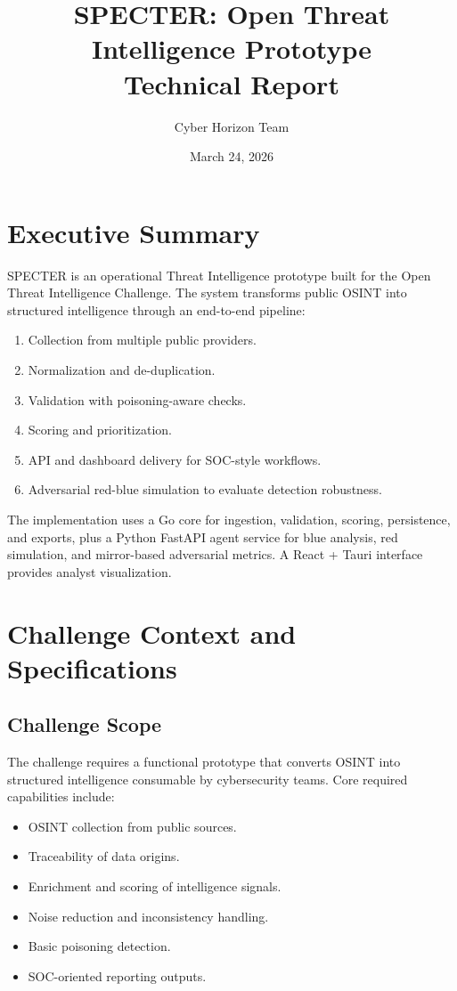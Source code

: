 \documentclass[11pt,a4paper]{article}
\title{SPECTER: Open Threat Intelligence Prototype\\Technical Report}
\author{Cyber Horizon Team}
\date{March 24, 2026}
\begin{document}
\maketitle
\tableofcontents
\newpage

\section{Executive Summary}
SPECTER is an operational Threat Intelligence prototype built for the Open Threat Intelligence Challenge. The system transforms public OSINT into structured intelligence through an end-to-end pipeline:
\begin{enumerate}[leftmargin=1.5em]
  \item Collection from multiple public providers.
  \item Normalization and de-duplication.
  \item Validation with poisoning-aware checks.
  \item Scoring and prioritization.
  \item API and dashboard delivery for SOC-style workflows.
  \item Adversarial red-blue simulation to evaluate detection robustness.
\end{enumerate}

The implementation uses a Go core for ingestion, validation, scoring, persistence, and exports, plus a Python FastAPI agent service for blue analysis, red simulation, and mirror-based adversarial metrics. A React + Tauri interface provides analyst visualization.

\section{Challenge Context and Specifications}
\subsection{Challenge Scope}
The challenge requires a functional prototype that converts OSINT into structured intelligence consumable by cybersecurity teams. Core required capabilities include:
\begin{itemize}[leftmargin=1.5em]
  \item OSINT collection from public sources.
  \item Traceability of data origins.
  \item Enrichment and scoring of intelligence signals.
  \item Noise reduction and inconsistency handling.
  \item Basic poisoning detection.
  \item SOC-oriented reporting outputs.
\end{itemize}
\end{document}
